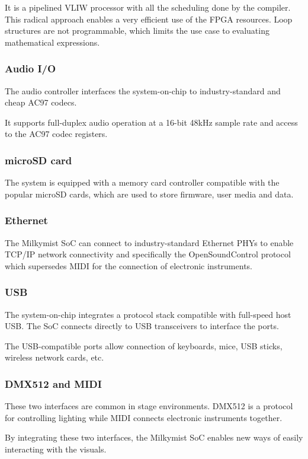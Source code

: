 \documentclass[a4paper,11pt,twocolumn]{paper}
\begin{document}
It is a pipelined VLIW processor with all the scheduling done by the compiler. This radical approach enables a very efficient use of the FPGA resources. Loop structures are not programmable, which limits the use case to evaluating mathematical expressions.

\subsubsection{Audio I/O}
The audio controller interfaces the system-on-chip to industry-standard and cheap AC97 codecs.

It supports full-duplex audio operation at a 16-bit 48kHz sample rate and access to the AC97 codec registers.

\subsubsection{microSD card}
The system is equipped with a memory card controller compatible with the popular microSD cards, which are used to store firmware, user media and data.

\subsubsection{Ethernet}
The Milkymist SoC can connect to industry-standard Ethernet PHYs to enable TCP/IP network connectivity and specifically the OpenSoundControl protocol which supersedes MIDI for the connection of electronic instruments.

\subsubsection{USB}
The system-on-chip integrates a protocol stack compatible with full-speed host USB. The SoC connects directly to USB transceivers to interface the ports.

The USB-compatible ports allow connection of keyboards, mice, USB sticks, wireless network cards, etc.

\subsubsection{DMX512 and MIDI}
These two interfaces are common in stage environments. DMX512 is a protocol for controlling lighting while MIDI connects electronic instruments together.

By integrating these two interfaces, the Milkymist SoC enables new ways of easily interacting with the visuals.
\end{document}
